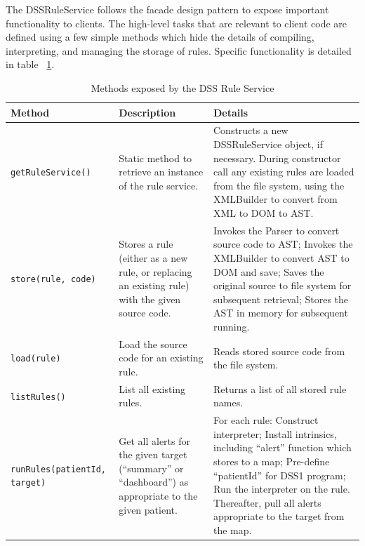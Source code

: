 \documentclass[12pt,letterpaper]{article}
\begin{document}
{The DSSRuleService follows the facade design pattern to expose important functionality to clients. The high-level tasks that are relevant to client code are defined using a few simple methods which hide the details of compiling, interpreting, and managing the storage of rules. Specific functionality is detailed in table ~\ref{tab:RULE_SERVICE}.

\begin{table}
\begin{center}
\begin{tabular}{ l | p{1.25in} | p{2.25in} }
Method & Description & Details \\ \hline

\texttt{getRuleService()}
&
Static method to retrieve an instance of the rule service.
&
Constructs a new DSSRuleService object, if necessary. During 
constructor call any existing rules are loaded from the file 
system, using the XMLBuilder to convert from XML to DOM to AST.
\\ \hline

\texttt{store(rule, code)}
&
Stores a rule (either as a new rule, or replacing an existing rule) with the given source code.
&
Invokes the Parser to convert source code to AST; 
Invokes the XMLBuilder to convert AST to DOM and save; 
Saves the original source to file system for subsequent retrieval; 
Stores the AST in memory for subsequent running.
\\ \hline

\texttt{load(rule)}
&
Load the source code for an existing rule.
&
Reads stored source code from the file system.
\\ \hline

\texttt{listRules()}
&
List all existing rules.
&
Returns a list of all stored rule names.
\\ \hline

\texttt{runRules(patientId, target)}
&
Get all alerts for the given target (“summary” or “dashboard”) as appropriate to the given patient.
&
For each rule:
Construct interpreter; 
Install intrinsics, including “alert” function which stores to a map;
Pre-define “patientId” for DSS1 program;
Run the interpreter on the rule.
Thereafter, pull all alerts appropriate to the target from the map.
\\ \hline

\end{tabular}
\end{center}
\caption{Methods exposed by the DSS Rule Service}
\label{tab:RULE_SERVICE}
\end{table}

}
\end{document}
